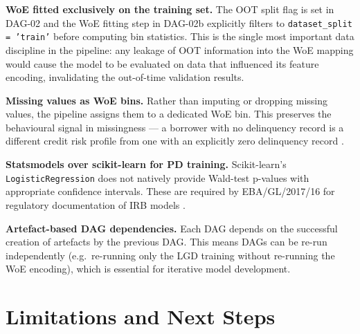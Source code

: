 \documentclass[12pt,a4paper]{report}
\begin{document}
\textbf{WoE fitted exclusively on the training set.} The OOT split flag is set in DAG-02 and the WoE fitting step in DAG-02b explicitly filters to \texttt{dataset\_split = 'train'} before computing bin statistics. This is the single most important data discipline in the pipeline: any leakage of OOT information into the WoE mapping would cause the model to be evaluated on data that influenced its feature encoding, invalidating the out-of-time validation results.

\textbf{Missing values as WoE bins.} Rather than imputing or dropping missing values, the pipeline assigns them to a dedicated WoE bin. This preserves the behavioural signal in missingness --- a borrower with no delinquency record is a different credit risk profile from one with an explicitly zero delinquency record \cite{lund2021}.

\textbf{Statsmodels over scikit-learn for PD training.} Scikit-learn's \texttt{LogisticRegression} does not natively provide Wald-test p-values with appropriate confidence intervals. These are required by EBA/GL/2017/16 for regulatory documentation of IRB models \cite{eba2017a}.

\textbf{Artefact-based DAG dependencies.} Each DAG depends on the successful creation of artefacts by the previous DAG. This means DAGs can be re-run independently (e.g.\ re-running only the LGD training without re-running the WoE encoding), which is essential for iterative model development.

\section{Limitations and Next Steps}
\end{document}
